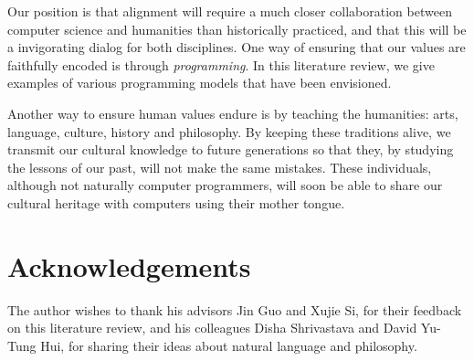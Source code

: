 \documentclass[10pt]{article}
\begin{document}
Our position is that alignment will require a much closer collaboration between computer science and humanities than historically practiced, and that this will be a invigorating dialog for both disciplines. One way of ensuring that our values are faithfully encoded is through \textit{programming}. In this literature review, we give examples of various programming models that have been envisioned.

Another way to ensure human values endure is by teaching the humanities: arts, language, culture, history and philosophy. By keeping these traditions alive, we transmit our cultural knowledge to future generations so that they, by studying the lessons of our past, will not make the same mistakes. These individuals, although not naturally computer programmers, will soon be able to share our cultural heritage with computers using their mother tongue.

\pagebreak \section{Acknowledgements}

The author wishes to thank his advisors Jin Guo and Xujie Si, for their feedback on this literature review, and his colleagues Disha Shrivastava and David Yu-Tung Hui, for sharing their ideas about natural language and philosophy.

  
  
\end{document}
